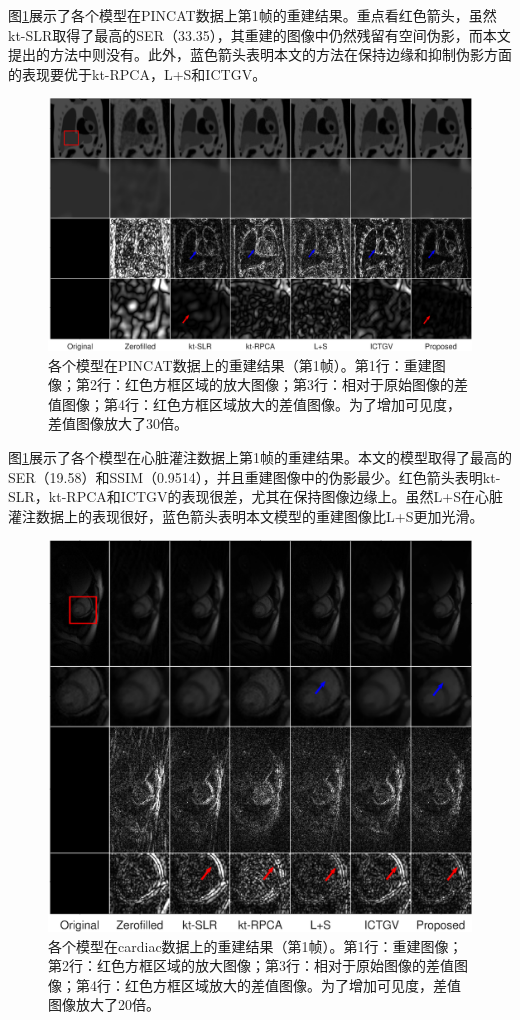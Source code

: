图\ref{fig:pincat}展示了各个模型在PINCAT数据上第1帧的重建结果。重点看红色箭头，虽然kt-SLR取得了最高的SER（33.35），其重建的图像中仍然残留有空间伪影，而本文提出的方法中则没有。此外，蓝色箭头表明本文的方法在保持边缘和抑制伪影方面的表现要优于kt-RPCA，L+S和ICTGV。
\begin{figure}
\centering
\includegraphics[width=1\textwidth]{img/tgvnn/figure2_pincat.eps}
\caption{各个模型在PINCAT数据上的重建结果（第1帧）。第1行：重建图像；第2行：红色方框区域的放大图像；第3行：相对于原始图像的差值图像；第4行：红色方框区域放大的差值图像。为了增加可见度，差值图像放大了30倍。}
\label{fig:pincat}
\end{figure}

图\ref{fig:pincat}展示了各个模型在心脏灌注数据上第1帧的重建结果。本文的模型取得了最高的SER（19.58）和SSIM（0.9514），并且重建图像中的伪影最少。红色箭头表明kt-SLR，kt-RPCA和ICTGV的表现很差，尤其在保持图像边缘上。虽然L+S在心脏灌注数据上的表现很好，蓝色箭头表明本文模型的重建图像比L+S更加光滑。
\begin{figure}
\centering
\includegraphics[width=1\textwidth]{img/tgvnn/figure3_perfusion.eps}
\caption{各个模型在cardiac数据上的重建结果（第1帧）。第1行：重建图像；第2行：红色方框区域的放大图像；第3行：相对于原始图像的差值图像；第4行：红色方框区域放大的差值图像。为了增加可见度，差值图像放大了20倍。}
\label{fig:perfusion}
\end{figure}

